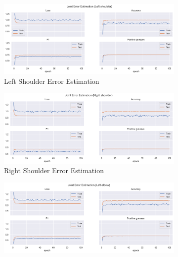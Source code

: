   
  \begin{figure}[!ht]
    \centering
    \begin{subfigure}[b]{0.47\linewidth}
        \centering
        \includegraphics[width=\textwidth]{figures/Results/v2_bs_40_is_64_e_100/jt/Left shoulder_ErrorEstimation.png}
        \caption{Left Shoulder Error Estimation}
        \label{fig:v2_lesh_jt_ee}
    \end{subfigure}
    \hfill
    \begin{subfigure}[b]{0.47\linewidth}
        \centering
        \includegraphics[width=\textwidth]{figures/Results/v2_bs_40_is_64_e_100/jt/Right shoulder_ErrorEstimation.png}
        \caption{Right Shoulder Error Estimation}
        \label{fig:v2_rish_jt_ee}
    \end{subfigure}
    \hfill
    \begin{subfigure}[b]{0.47\linewidth}
        \centering
        \includegraphics[width=\textwidth]{figures/Results/v2_bs_40_is_64_e_100/jt/Left elbow_ErrorEstimation.png}

\end{subfigure}
\end{figure}
